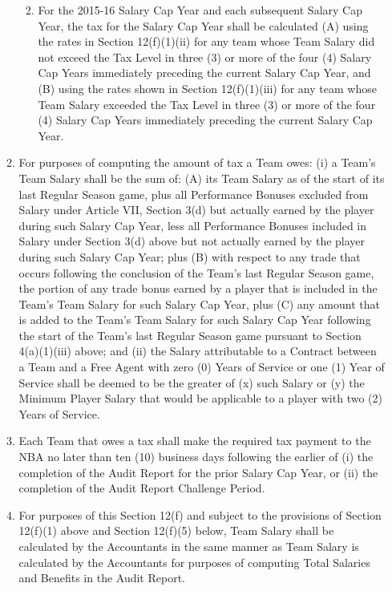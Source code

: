 \documentclass[
]{book}
\providecommand{\tightlist}{%
  \setlength{\itemsep}{0pt}\setlength{\parskip}{0pt}}
\begin{document}
\begin{enumerate}
\begin{enumerate}
    \begin{enumerate}
    \def\labelenumiii{(\roman{enumiii})}
    \setcounter{enumiii}{3}
    \tightlist
    \item
      For the 2015-16 Salary Cap Year and each subsequent Salary Cap Year, the tax for the Salary Cap Year shall be calculated (A) using the rates in Section 12(f)(1)(ii) for any team whose Team Salary did not exceed the Tax Level in three (3) or more of the four (4) Salary Cap Years immediately preceding the current Salary Cap Year, and (B) using the rates shown in Section 12(f)(1)(iii) for any team whose Team Salary exceeded the Tax Level in three (3) or more of the four (4) Salary Cap Years immediately preceding the current Salary Cap Year.
    \end{enumerate}
  \item
    For purposes of computing the amount of tax a Team owes: (i) a Team's Team Salary shall be the sum of: (A) its Team Salary as of the start of its last Regular Season game, plus all Performance Bonuses excluded from Salary under Article VII, Section 3(d) but actually earned by the player during such Salary Cap Year, less all Performance Bonuses included in Salary under Section 3(d) above but not actually earned by the player during such Salary Cap Year; plus (B) with respect to any trade that occurs following the conclusion of the Team's last Regular Season game, the portion of any trade bonus earned by a player that is included in the Team's Team Salary for such Salary Cap Year, plus (C) any amount that is added to the Team's Team Salary for such Salary Cap Year following the start of the Team's last Regular Season game pursuant to Section 4(a)(1)(iii) above; and (ii) the Salary attributable to a Contract between a Team and a Free Agent with zero (0) Years of Service or one (1) Year of Service shall be deemed to be the greater of (x) such Salary or (y) the Minimum Player Salary that would be applicable to a player with two (2) Years of Service.
  \item
    Each Team that owes a tax shall make the required tax payment to the NBA no later than ten (10) business days following the earlier of (i) the completion of the Audit Report for the prior Salary Cap Year, or (ii) the completion of the Audit Report Challenge Period.
  \item
    For purposes of this Section 12(f) and subject to the provisions of Section 12(f)(1) above and Section 12(f)(5) below, Team Salary shall be calculated by the Accountants in the same manner as Team Salary is calculated by the Accountants for purposes of computing Total Salaries and Benefits in the Audit Report.

\end{enumerate}
\end{enumerate}
\end{document}

